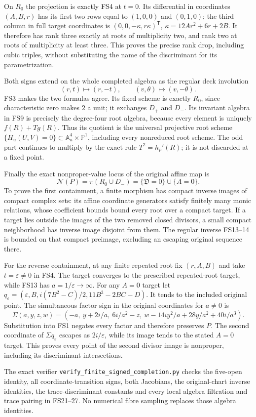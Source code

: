 On $R_0$ the projection is exactly FS4 at $t=0$.
Its differential in coordinates $(A,B,r)$ has its first
two rows equal to $(1,0,0)$ and $(0,1,0)$; the third
column in full target coordinates is
$(0,0,-\kappa,r\kappa)^{\mathsf T}$,
$\kappa=12Ar^2+6r+2B$.
It therefore has rank three exactly at roots of
multiplicity two, and rank two at roots of multiplicity
at least three. This proves the precise rank drop,
including cubic triples, without substituting the name
of the discriminant for its parametrization.

Both signs extend on the whole completed algebra as the
regular deck involution
\begin{equation}
(r,t)\mapsto(r,-t),\qquad
(v,\theta)\mapsto(v,-\theta).
\tag{FS30}
\end{equation}
FS3 makes the two formulas agree. Its fixed scheme is
exactly $R_0$, since characteristic zero makes $2$ a unit;
it exchanges $D_+$ and $D_-$. Its invariant algebra
in FS9 is precisely the degree-four root algebra, because
every element is uniquely $f(R)+Tg(R)$.
Thus its quotient is the universal projective root scheme
$\{H_u(U,V)=0\}\subset\mathbb A^4_u\times\mathbb P^1$,
including every nonreduced root scheme. The odd part
continues to multiply by the exact rule $T^2=h_p'(R)$;
it is not discarded at a fixed point.

Finally the exact nonproper-value locus of the original
affine map is
\begin{equation}
\mathcal N(P)=\pi(R_0\cup D_-)
            =\{\mathfrak D=0\}\cup\{A=0\}.
\tag{FS31}
\end{equation}
To prove the first containment, a finite morphism has
compact inverse images of compact complex sets: its
affine coordinate generators satisfy finitely many
monic relations, whose coefficient bounds bound every
root over a compact target. If a target lies outside
the images of the two removed closed divisors, a small
compact neighborhood has inverse image disjoint from
them. The regular inverse FS13--14 is bounded on that
compact preimage, excluding an escaping original
sequence there.

For the reverse containment, at any finite repeated root
fix $(r,A,B)$ and take $t=\varepsilon\ne0$ in FS4.
The target converges to the prescribed repeated-root
target, while FS13 has $a=1/\varepsilon\to\infty$.
For any $A=0$ target let
$q_\varepsilon=(\varepsilon,B,i(7B^2-C)/2,11B^3-2BC-D)$.
It tends to the included original point. The simultaneous
factor sign in the original coordinates for $a\ne0$ is
\[
\Sigma(a,y,z,w)=
(-a,\ y+2i/a,\ 6i/a^2-z,\
 w-14iy^2/a+28y/a^2+40i/a^3).
\]
Substitution into FS1 negates every factor and therefore
preserves $P$. The second coordinate of
$\Sigma q_\varepsilon$ escapes as $2i/\varepsilon$,
while its image tends to the stated $A=0$ target.
This proves every point of the second divisor image is
nonproper, including its discriminant intersections.

The exact verifier
\texttt{verify\_finite\_signed\_completion.py} checks the
five-open identity, all coordinate-transition signs,
both Jacobians, the original-chart inverse identities,
the trace-discriminant constants and every local
algebra filtration and trace pairing in FS21--27.
No numerical fibre sampling replaces those algebra identities.
